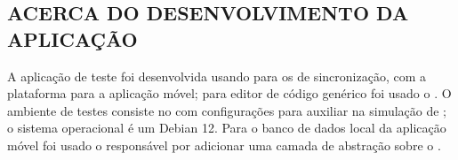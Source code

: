 \subsection{ACERCA DO DESENVOLVIMENTO DA APLICAÇÃO}

A aplicação de teste foi desenvolvida usando  para os  de sincronização,  com a plataforma  para a aplicação móvel; para editor de código genérico foi usado o . O ambiente de testes consiste no  com configurações para auxiliar na simulação de ; o sistema operacional  é um Debian 12. Para o banco de dados local da aplicação móvel foi usado o  responsável por adicionar uma camada de abstração sobre o .
